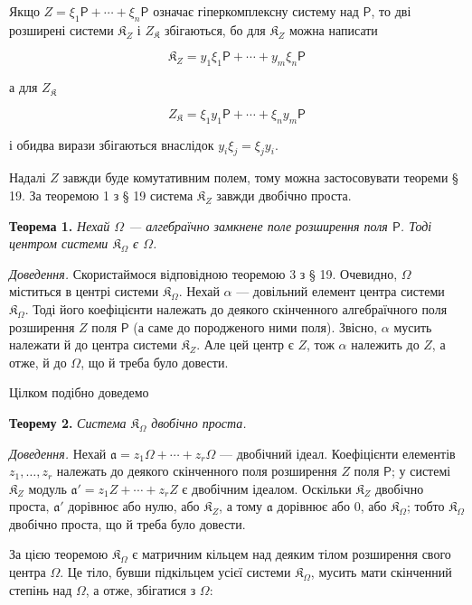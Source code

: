 \documentclass[11pt]{article}
\begin{document}
Якщо \(Z=\xi_1\mathsf P+\cdots+\xi_n\mathsf P\) означає гіперкомплексну систему над \(\mathsf P\), то дві розширені системи \(\mathfrak K_Z\) і \(Z_{\mathfrak K}\) збігаються, бо для \(\mathfrak K_Z\) можна написати

\[
\mathfrak K_Z=y_1\xi_1\mathsf P+\cdots+y_m\xi_n\mathsf P
\]

а для \(Z_{\mathfrak K}\)

\[
Z_{\mathfrak K}=\xi_1y_1\mathsf P+\cdots+\xi_ny_m\mathsf P
\]

і обидва вирази збігаються внаслідок \(y_i\xi_j=\xi_jy_i\).

Надалі \(Z\) завжди буде комутативним полем, тому можна застосовувати теореми § 19. За теоремою 1 з § 19 система \(\mathfrak K_Z\) завжди двобічно проста.

\textbf{Теорема 1.} \emph{Нехай \(\Omega\) --- алгебраїчно замкнене поле розширення поля \(\mathsf P\). Тоді центром системи \(\mathfrak K_\Omega\) є \(\Omega\).}

\emph{Доведення.} Скористаймося відповідною теоремою 3 з § 19. Очевидно, \(\Omega\) міститься в центрі системи \(\mathfrak K_\Omega\). Нехай \(\alpha\) --- довільний елемент центра системи \(\mathfrak K_\Omega\). Тоді його коефіцієнти належать до деякого скінченного алгебраїчного поля розширення \(Z\) поля \(\mathsf P\) (а саме до породженого ними поля). Звісно, \(\alpha\) мусить належати й до центра системи \(\mathfrak K_Z\). Але цей центр є \(Z\), тож \(\alpha\) належить до \(Z\), а отже, й до \(\Omega\), що й треба було довести.

Цілком подібно доведемо

\textbf{Теорему 2.} \emph{Система \(\mathfrak K_\Omega\) двобічно проста.}

\emph{Доведення.} Нехай \(\mathfrak a=z_1\Omega+\cdots+z_r\Omega\) --- двобічний ідеал. Коефіцієнти елементів \(z_1,\ldots,z_r\) належать до деякого скінченного поля розширення \(Z\) поля \(\mathsf P\); у системі \(\mathfrak K_Z\) модуль \(\mathfrak a'=z_1Z+\cdots+z_rZ\) є двобічним ідеалом. Оскільки \(\mathfrak K_Z\) двобічно проста, \(\mathfrak a'\) дорівнює або нулю, або \(\mathfrak K_Z\), а тому \(\mathfrak a\) дорівнює або 0, або \(\mathfrak K_\Omega\); тобто \(\mathfrak K_\Omega\) двобічно проста, що й треба було довести.

За цією теоремою \(\mathfrak K_\Omega\) є матричним кільцем над деяким тілом розширення свого центра \(\Omega\). Це тіло, бувши підкільцем усієї системи \(\mathfrak K_\Omega\), мусить мати скінченний степінь над \(\Omega\), а отже, збігатися з \(\Omega\):
\end{document}
